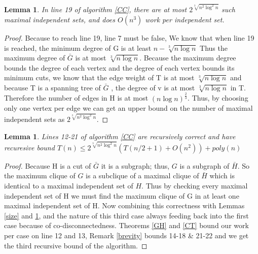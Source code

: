 \documentclass[12pt]{article}
\newtheorem{lem}[thm]{Lemma}
\begin{document}
\begin{lem} \label{count} In line 19 of algorithm \ref{CC}, there are at most $2^{\sqrt[3]{n^2\log^2n}}$ such maximal independent sets, and does $O(n^3)$ work per independent set.\end{lem}
\begin{proof} Because to reach line 19, line 7 must be false, We know that when line 19 is reached, the minimum degree of G is at least $n - \sqrt[3]{n\log n }$ Thus the maximum degree of $\bar{G}$ is at most $\sqrt[3]{n\log n}$. Because the maximum degree bounds the degree of each vertex and the degree of each vertex bounds its minimum cuts, we know that the edge weight of T is at most $\sqrt[3]{n \log n}$ and because T is a spanning tree of $\bar{G}$ , the degree of v is at most $\sqrt[3]{n\log n}$ in T. Therefore the number of edges in H is at most $(n\log n )^{\frac{2}{3}}$. Thus, by choosing only one vertex per edge we can get an upper bound on the number of maximal independent sets as $2^{\sqrt[3]{n^2\log^2n}}$.
\end{proof}
\begin{lem}\label{cut} Lines 12-21 of algorithm \ref{CC} are recursively correct and have recuresive bound $T(n) \le 2^{\sqrt[3]{n^2\log^2 n}}(T(n/2+1)+ O(n^2)) + poly(n)$\end{lem}
\begin{proof} Because H is a cut of $\bar{G}$ it is a subgraph; thus, $G$ is a subgraph of $\bar{H}$. So the maximum clique of $G$ is a subclique of a maximal clique of $\bar{H}$ which is identical to a maximal independent set of $H$. Thus by checking every maximal independent set of H we must find the maximum clique of G in at least one maximal independent set of H. Now combining this correctness with Lemmas \ref{size} and \ref{count}, and the nature of this third case always feeding back into the first case because of co-disconnectedness. Theorems \ref{GH} and \ref{CT} bound our work per case on line 12 and 13, Remark \ref{brevity} bounds 14-18 \& 21-22 and we get the third recursive bound of the algorithm.
\end{proof}
\end{document}
